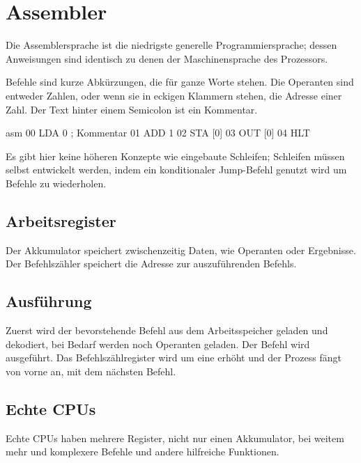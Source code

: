 \documentclass{article}
\begin{document}
\section{Assembler}
Die Assemblersprache ist die niedrigste generelle Programmiersprache; dessen Anweisungen sind identisch zu denen der Maschinensprache des Prozessors.

Befehle sind kurze Abkürzungen, die für ganze Worte stehen. Die Operanten sind entweder Zahlen, oder wenn sie in eckigen Klammern stehen, die Adresse einer Zahl. Der Text hinter einem Semicolon ist ein Kommentar.
\begin{slsourcecode}{asm}
00 LDA 0 ; Kommentar
01 ADD 1
02 STA [0]
03 OUT [0]
04 HLT
\end{slsourcecode}
Es gibt hier keine höheren Konzepte wie eingebaute Schleifen; Schleifen müssen selbst entwickelt werden, indem ein konditionaler Jump-Befehl genutzt wird um Befehle zu wiederholen.

\subsection{Arbeitsregister}
Der Akkumulator speichert zwischenzeitig Daten, wie Operanten oder Ergebnisse. Der Befehlszähler speichert die Adresse zur auszuführenden Befehls.

\subsection{Ausführung}
Zuerst wird der bevorstehende Befehl aus dem Arbeitsspeicher geladen und dekodiert, bei Bedarf werden noch Operanten geladen. Der Befehl wird ausgeführt. Das Befehlszählregister wird um eine erhöht und der Prozess fängt von vorne an, mit dem nächsten Befehl.

\subsection{Echte CPUs}
Echte CPUs haben mehrere Register, nicht nur einen Akkumulator, bei weitem mehr und komplexere Befehle und andere hilfreiche Funktionen.
\end{document}
